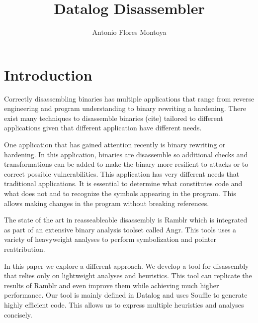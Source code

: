 \documentclass[]{llncs}
\author{Antonio Flores Montoya}
\title{Datalog Disassembler}
\begin{document}
\maketitle
\section{Introduction}
Correctly disassembling binaries has multiple applications that range
from reverse engineering and program understanding to binary rewriting
a hardening. There exist many techniques to disassemble binaries
(cite) tailored to different applications given that different
application have different needs.

One application that has gained attention recently is binary rewriting
or hardening. In this application, binaries are disassemble so
additional checks and transformations can be added to make the binary
more resilient to attacks or to correct possible vulnerabilities.
This application has very different needs that traditional
applications.  It is essential to determine what constitutes code and
what does not and to recognize the symbols appearing in the
program. This allows making changes in the program without breaking
references.

The state of the art in reasseableable disassembly is Ramblr\cite{}
which is integrated as part of an extensive binary analysis toolset
called Angr\cite{}.  This tools uses a variety of heavyweight analyses
to perform symbolization and pointer reattribution.

In this paper we explore a different approach. We develop a tool for
disassembly that relies only on lightweight analyses and
heuristics. This tool can replicate the results of Ramblr and even
improve them while achieving much higher performance. Our tool is
mainly defined in Datalog and uses Souffle\cite{} to generate highly
efficient code.  This allows us to express multiple heuristics and
analyses concisely.
\end{document}
